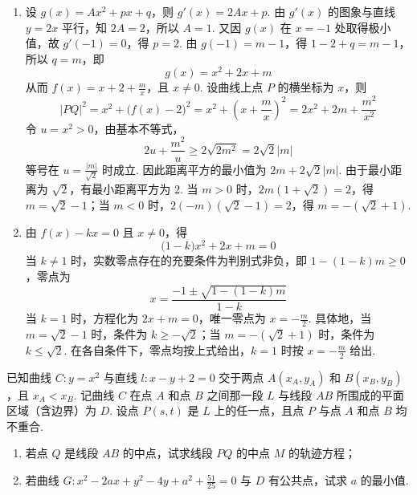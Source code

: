 \begin{solution}
\begin{enumerate}
\item 设 \(g(x)=A x^2+px+q\)，则 \(g'(x)=2Ax+p\). 由 \(g'(x)\) 的图象与直线 \(y=2x\) 平行，知 \(2A=2\)，所以 \(A=1\). 又因 \(g(x)\) 在 \(x=-1\) 处取得极小值，故 \(g'(-1)=0\)，得 \(p=2\). 由 \(g(-1)=m-1\)，得 \(1-2+q=m-1\)，所以 \(q=m\)，即
\[
g(x)=x^2+2x+m
\]
从而 \(f(x)=x+2+\frac mx\)，且 \(x\neq0\). 设曲线上点 \(P\) 的横坐标为 \(x\)，则
\[
|PQ|^2=x^2+\bigl(f(x)-2\bigr)^2=x^2+\left(x+\frac mx\right)^2=2x^2+2m+\frac{m^2}{x^2}
\]
令 \(u=x^2>0\)，由基本不等式，
\[
2u+\frac{m^2}{u}\geqslant2\sqrt{2m^2}=2\sqrt2|m|
\]
等号在 \(u=\frac{|m|}{\sqrt2}\) 时成立. 因此距离平方的最小值为 \(2m+2\sqrt2|m|\). 由于最小距离为 \(\sqrt2\)，有最小距离平方为 \(2\). 当 \(m>0\) 时，\(2m(1+\sqrt2)=2\)，得 \(m=\sqrt2-1\)；当 \(m<0\) 时，\(2(-m)(\sqrt2-1)=2\)，得 \(m=-(\sqrt2+1)\).
\item 由 \(f(x)-kx=0\) 且 \(x\neq0\)，得
\[
\bigl(1-k\bigr)x^2+2x+m=0
\]
当 \(k\neq1\) 时，实数零点存在的充要条件为判别式非负，即 \(1-(1-k)m\geqslant0\)，零点为
\[
x=\frac{-1\pm\sqrt{1-(1-k)m}}{1-k}
\]
当 \(k=1\) 时，方程化为 \(2x+m=0\)，唯一零点为 \(x=-\frac m2\). 具体地，当 \(m=\sqrt2-1\) 时，条件为 \(k\geqslant-\sqrt2\)；当 \(m=-(\sqrt2+1)\) 时，条件为 \(k\leqslant\sqrt2\). 在各自条件下，零点均按上式给出，\(k=1\) 时按 \(x=-\frac m2\) 给出.
\end{enumerate}
\end{solution}

\begin{problem}
已知曲线 \(C: y = x^2\) 与直线 \(l: x - y + 2 = 0\) 交于两点 \(A(x_A, y_A)\) 和 \(B(x_B, y_B)\)，且 \(x_A < x_B\). 记曲线 \(C\) 在点 \(A\) 和点 \(B\) 之间那一段 \(L\) 与线段 \(AB\) 所围成的平面区域（含边界）为 \(D\). 设点 \(P(s, t)\) 是 \(L\) 上的任一点，且点 \(P\) 与点 \(A\) 和点 \(B\) 均不重合.
\begin{enumerate}
\item 若点 \(Q\) 是线段 \(AB\) 的中点，试求线段 \(PQ\) 的中点 \(M\) 的轨迹方程；
\item 若曲线 \(G: x^{2} - 2ax + y^{2} - 4y + a^{2} + \frac{51}{25} = 0\) 与 \(D\) 有公共点，试求 \(a\) 的最小值.
\end{enumerate}
\end{problem}

